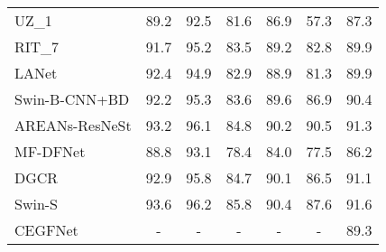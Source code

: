 \documentclass[journal]{IEEEtran}
\begin{document}
\begin{table*}[h!]
\begin{tabular}{lcccccc}
UZ\_1 \cite{rs9050446}                                  & 89.2                               & 92.5                         & 81.6                           & 86.9                     & 57.3                    & 87.3                                                     \\
RIT\_7 \cite{10.1007/978-3-642-75988-8_28}                                 & 91.7                               & 95.2                         & 83.5                           & 89.2                     & 82.8                    & 89.9                                                     \\
LANet \cite{9102424}                                  & 92.4                               & 94.9                         & 82.9                           & 88.9                     & 81.3                    & 89.9                                                     \\
Swin-B-CNN+BD \cite{9686732}                          & 92.2                               & 95.3                         & 83.6                           & 89.6                     & 86.9                    & 90.4                                                     \\
AREANs-ResNeSt \cite{doi:10.1080/2150704X.2021.1910362}                         & 93.2                               & 96.1                         & 84.8                           & 90.2                     & 90.5                    & 91.3                                                     \\
MF-DFNet \cite{doi:10.1080/01431161.2021.2018147}                              & 88.8                               & 93.1                         & 78.4                           & 84.0                     & 77.5                    & 86.2                                                     \\
DGCR \cite{9690154}                                   & 92.9                               & 95.8                         & 84.7                           & 90.1                     & 86.5                    & 91.1                                                     \\
Swin-S \cite{9681903}                                 & 93.6                               & 96.2                         & 85.8                           & 90.4                     & 87.6                    & 91.6                                                     \\
CEGFNet \cite{9538389}                                & -                                  & -                            & -                              & -                        & -                       & 89.3                                                     \\

\end{tabular}
\end{table*}
\end{document}
